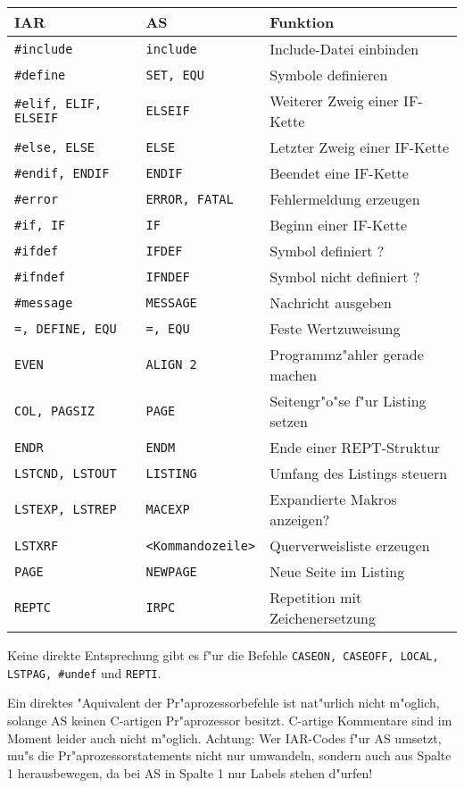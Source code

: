 \documentclass[12pt,a4paper,twoside]{report}
\newcommand{\tty}[1]{{\tt #1}}
\begin{document}
\begin{table*}[htb]
\begin{center}\begin{tabular}{|l|l|l|}
\hline
IAR & AS & Funktion\\
\hline
\hline
\tty{\#include} & \tty{include} & Include-Datei einbinden \\
\tty{\#define} & \tty{SET, EQU} & Symbole definieren \\
\tty{\#elif, ELIF, ELSEIF} & \tty{ELSEIF} & Weiterer Zweig einer IF-Kette \\
\tty{\#else, ELSE} & \tty{ELSE} & Letzter Zweig einer IF-Kette \\
\tty{\#endif, ENDIF} & \tty{ENDIF} & Beendet eine IF-Kette \\
\tty{\#error} & \tty{ERROR, FATAL} & Fehlermeldung erzeugen \\
\tty{\#if, IF} & \tty{IF} & Beginn einer IF-Kette\\
\tty{\#ifdef} & \tty{IFDEF} & Symbol definiert ? \\
\tty{\#ifndef} & \tty{IFNDEF} & Symbol nicht definiert ? \\
\tty{\#message} & \tty{MESSAGE} & Nachricht ausgeben \\
\tty{=, DEFINE, EQU} & \tty{=, EQU} & Feste Wertzuweisung \\
\tty{EVEN} & \tty{ALIGN 2} & Programmz"ahler gerade machen \\
\tty{COL, PAGSIZ} & \tty{PAGE} & Seitengr"o"se f"ur Listing setzen \\
\tty{ENDR} & \tty{ENDM} & Ende einer REPT-Struktur \\
\tty{LSTCND, LSTOUT} & \tty{LISTING} & Umfang des Listings steuern \\
\tty{LSTEXP, LSTREP} & \tty{MACEXP} & Expandierte Makros anzeigen? \\
\tty{LSTXRF} & \verb!<Kommandozeile>! & Querverweisliste erzeugen \\
\tty{PAGE} & \tty{NEWPAGE} & Neue Seite im Listing \\
\tty{REPTC} & \tty{IRPC} & Repetition mit Zeichenersetzung \\
\hline
\end{tabular}\end{center}
\end{table*}

Keine direkte Entsprechung gibt es f"ur die Befehle {\tt CASEON, CASEOFF,
LOCAL, LSTPAG, \#undef} und {\tt REPTI}.

Ein direktes "Aquivalent der Pr"aprozessorbefehle ist nat"urlich nicht
m"oglich, solange AS keinen C-artigen Pr"aprozessor besitzt.  C-artige
Kommentare sind im Moment leider auch nicht m"oglich.  Achtung: Wer
IAR-Codes f"ur AS umsetzt, mu"s die Pr"aprozessorstatements nicht nur
umwandeln, sondern auch aus Spalte 1 herausbewegen, da bei AS in Spalte 1
nur Labels stehen d"urfen!
\end{document}
